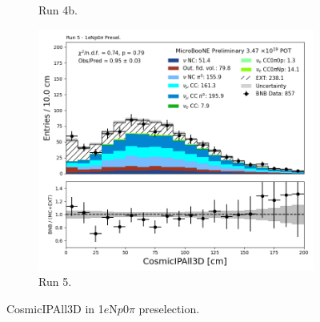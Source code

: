 \begin{figure}[H]
\begin{subfigure}[t]{0.32\linewidth}
        \caption{Run 4b.}
    \end{subfigure}%
    \hspace{0.2cm}%
    \begin{subfigure}[t]{0.32\linewidth}
        \includegraphics[width=\linewidth]{technote/Appendix_Preselection/Figures/1eNp0pi/Run5/CosmicIPAll3D_Run5_1eNp0pi_Presel.png}
        \caption{Run 5.}
    \end{subfigure}
    \caption{CosmicIPAll3D in 1$e$N$p$0$\pi$ preselection.}
\end{figure}

